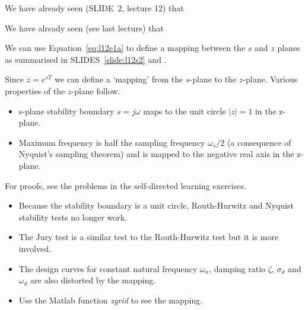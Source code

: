 We have already seen (SLIDE~2, lecture 12) that
\ifslidesonly
\begin{slide}
We have already seen (see last lecture) that

\end{slide}
\fi


We can use Equation~\ref{eq:l12e1a} to define a mapping between the $s$ and $z$ planes as summarised in SLIDES~\ref{slide:l12s2} and .
\begin{slide}\label{slide:l12s2}
  Since $z=e^{sT}$ we can define a `mapping' from the $s$-plane to the $z$-plane. Various properties of the $z$-plane follow.
\begin{itemize}
  \item s-plane stability boundary $s=j\omega$ maps to the unit circle $|z|=1$ in the z-plane.
  \item Maximum frequency is half the sampling frequency $\omega_s/2$ (a consequence of Nyquist's sampling theorem) and is mapped to the negative real axis in the z-plane.
\end{itemize}
For proofs, see the problems in the self-directed learning exercises.
\end{slide}

\begin{slide}\label{slide:l12s3}
\begin{itemize}
  \item Because the stability boundary is a unit circle, Routh-Hurwitz and Nyquist stability tests no longer work.
  \item The Jury test is a similar test to the Routh-Hurwitz test but it is more involved.
  \item The design curves for constant natural frequency $\omega_n$, damping ratio $\zeta$, $\sigma_d$ and $\omega_d$ are also distorted by the mapping.
  \item Use the Matlab function \emph{zgrid} to see the mapping.
\end{itemize}
\end{slide}

